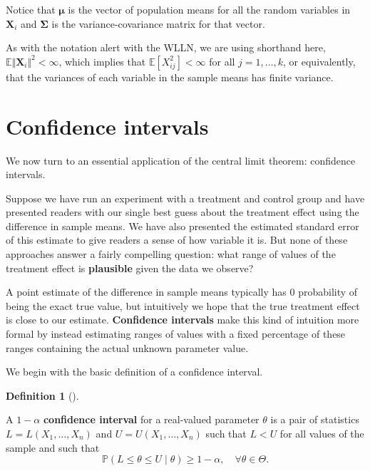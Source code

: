 \documentclass[
  13pt,
  letterpaper,
  DIV=11,
  numbers=noendperiod]{scrreprt}
\newcommand{\mb}{\symbf}
\newcommand{\E}{\mathbb{E}}
\renewcommand{\P}{\mathbb{P}}
\newcommand{\X}{\mb{X}}
\theoremstyle{plain}
\theoremstyle{definition}
\theoremstyle{definition}
\newtheorem{definition}{Definition}[chapter]
\theoremstyle{remark}
\begin{document}
Notice that \(\mb{\mu}\) is the vector of population means for all the
random variables in \(\X_i\) and \(\mb{\Sigma}\) is the
variance-covariance matrix for that vector.

\begin{tcolorbox}[enhanced jigsaw, title=\textcolor{quarto-callout-note-color}{\faInfo}\hspace{0.5em}{Note}, breakable, colbacktitle=quarto-callout-note-color!10!white, toptitle=1mm, colback=white, arc=.35mm, left=2mm, opacityback=0, titlerule=0mm, colframe=quarto-callout-note-color-frame, leftrule=.75mm, coltitle=black, opacitybacktitle=0.6, bottomtitle=1mm, rightrule=.15mm, bottomrule=.15mm, toprule=.15mm]

As with the notation alert with the WLLN, we are using shorthand here,
\(\E\Vert \mb{X}_i \Vert^2 < \infty\), which implies that
\(\E[X_{ij}^2] < \infty\) for all \(j = 1,\ldots, k\), or equivalently,
that the variances of each variable in the sample means has finite
variance.

\end{tcolorbox}

\section{Confidence intervals}\label{confidence-intervals}

We now turn to an essential application of the central limit theorem:
confidence intervals.

Suppose we have run an experiment with a treatment and control group and
have presented readers with our single best guess about the treatment
effect using the difference in sample means. We have also presented the
estimated standard error of this estimate to give readers a sense of how
variable it is. But none of these approaches answer a fairly compelling
question: what range of values of the treatment effect is
\textbf{plausible} given the data we observe?

A point estimate of the difference in sample means typically has 0
probability of being the exact true value, but intuitively we hope that
the true treatment effect is close to our estimate. \textbf{Confidence
intervals} make this kind of intuition more formal by instead estimating
ranges of values with a fixed percentage of these ranges containing the
actual unknown parameter value.

We begin with the basic definition of a confidence interval.

\begin{definition}[]\protect\hypertarget{def-coverage}{}\label{def-coverage}

A \(1-\alpha\) \textbf{confidence interval} for a real-valued parameter
\(\theta\) is a pair of statistics \(L= L(X_1, \ldots, X_n)\) and
\(U = U(X_1, \ldots, X_n)\) such that \(L < U\) for all values of the
sample and such that \[ 
\P(L \leq \theta \leq U \mid \theta) \geq 1-\alpha, \quad \forall \theta \in \Theta.
\]

\end{definition}
\end{document}
